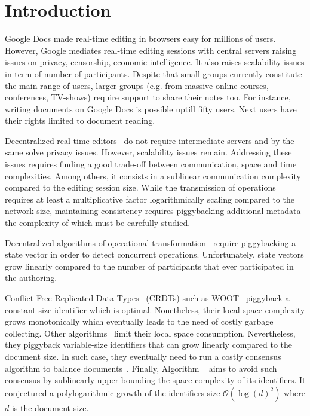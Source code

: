 
\section{Introduction}

Google Docs made real-time editing in browsers easy for millions of
users. However, Google mediates real-time editing sessions with central servers
raising issues on privacy, censorship, economic intelligence. It also raises
scalability issues in term of number of participants.  Despite that small groups
currently constitute the main range of users, larger groups (e.g. from massive
online courses, conferences, TV-shows) require support to share their notes too.
For instance, writing documents on Google Docs is possible uptill fifty
users. Next users have their rights limited to document reading.

Decentralized real-time editors~\cite{oster2006data, sun1998operational,
  sun2009contextbased} do not require intermediate servers and by the same solve
privacy issues. However, scalability issues remain.  Addressing these issues
requires finding a good trade-off between communication, space and time
complexities. Among others, it consists in a sublinear communication complexity
compared to the editing session size. While the transmission of operations
requires at least a multiplicative factor logarithmically scaling compared to
the network size, maintaining consistency requires piggybacking additional
metadata the complexity of which must be carefully studied.

Decentralized algorithms of operational
transformation~\cite{sun2009contextbased} require piggybacking a state vector in
order to detect concurrent operations. Unfortunately, state vectors grow
linearly compared to the number of participants that ever participated in the
authoring.

Conflict-Free Replicated Data Types~\cite{shapiro2011comprehensive} (CRDTs) such
as WOOT~\cite{oster2006data} piggyback a constant-size identifier which is
optimal. Nonetheless, their local space complexity grows monotonically which
eventually leads to the need of costly garbage collecting. Other
algorithms~\cite{preguica2009commutative, weiss2010logootundo} limit their local
space consumption. Nevertheless, they piggyback variable-size identifiers that
can grow linearly compared to the document size. In such case, they eventually
need to run a costly consensus algorithm to balance
documents~\cite{zawirski2011asynchronous}. Finally, Algorithm
\LSEQ~\cite{nedelec2013concurrency} aims to avoid such consensus by sublinearly
upper-bounding the space complexity of its identifiers. It conjectured a
polylogarithmic growth of the identifiers size $\mathcal{O}(\log(d)^2)$ where
$d$ is the document size.

